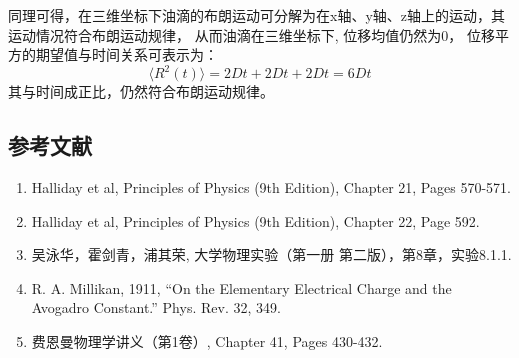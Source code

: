 \documentclass[12pt,a4paper,UTF8]{ctexart}
\begin{document}
\begin{enumerate}
同理可得，在三维坐标下油滴的布朗运动可分解为在x轴、y轴、z轴上的运动，其运动情况符合布朗运动规律，
从而油滴在三维坐标下,
位移均值仍然为0，
位移平方的期望值与时间关系可表示为：
\begin{equation}    		
		\langle R^2(t)\rangle =2Dt+2Dt+2Dt=6Dt
\end{equation}
其与时间成正比，仍然符合布朗运动规律。
\end{enumerate}

\subsection*{参考文献}
\begin{enumerate}
    \item Halliday et al, Principles of Physics (9th Edition), Chapter 21, Pages 570-571.
    \item Halliday et al, Principles of Physics (9th Edition), Chapter 22, Page 592.
    \item 吴泳华，霍剑青，浦其荣, 大学物理实验（第一册 第二版），第8章，实验8.1.1.
    \item R. A. Millikan, 1911, “On the Elementary Electrical Charge and the Avogadro Constant.” Phys. Rev. 32, 349.
    \item 费恩曼物理学讲义（第1卷）, Chapter 41, Pages 430-432.
\end{enumerate}
\end{document}
